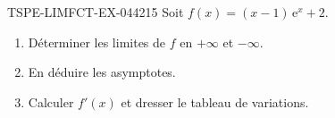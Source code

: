 \begin{exercice}{TSPE-LIMFCT-EX-044}{2}{15}
Soit $f(x) = (x-1)\,\mathrm{e}^x + 2$.
\begin{enumerate}
  \item Déterminer les limites de $f$ en $+\infty$ et $-\infty$.
  \item En déduire les asymptotes.
  \item Calculer $f'(x)$ et dresser le tableau de variations.
\end{enumerate}
\end{exercice}

